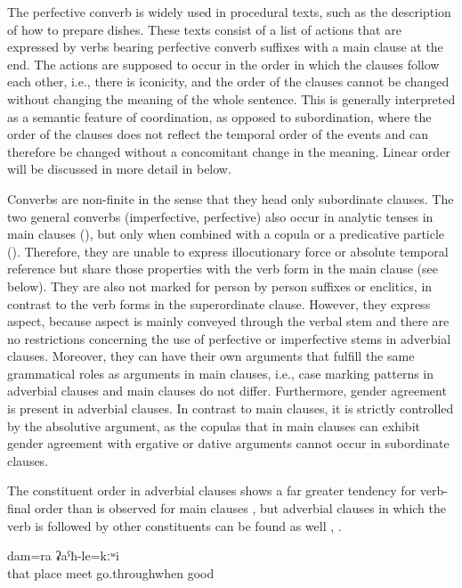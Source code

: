 The perfective converb is widely used in procedural texts, such as the description of how to prepare dishes. These texts consist of a list of actions that are expressed by verbs bearing perfective converb suffixes with a main clause at the end. The actions are supposed to occur in the order in which the clauses follow each other, i.e., there is iconicity, and the order of the clauses cannot be changed without changing the meaning of the whole sentence. This is generally interpreted as a semantic feature of coordination, as opposed to subordination, where the order of the clauses does not reflect the temporal order of the events and can therefore be changed without a concomitant change in the meaning. Linear order will be discussed in more detail in  below.

Converbs are non-finite in the sense that they head only subordinate clauses. The two general converbs (imperfective, perfective) also occur in analytic tenses in main clauses (), but only when combined with a copula or a predicative particle (). Therefore, they are unable to express illocutionary force or absolute temporal reference but share those properties with the verb form in the main clause (see  below). They are also not marked for person by person suffixes or enclitics, in contrast to the verb forms in the superordinate clause. However, they express aspect, because aspect is mainly conveyed through the verbal stem and there are no restrictions concerning the use of perfective or imperfective stems in adverbial clauses. Moreover, they can have their own arguments that fulfill the same grammatical roles as arguments in main clauses, i.e., case marking patterns in adverbial clauses and main clauses do not differ. Furthermore, gender agreement is present in adverbial clauses. In contrast to main clauses, it is strictly controlled by the absolutive argument, as the copulas that in main clauses can exhibit gender agreement with ergative or dative arguments cannot occur in subordinate clauses.

The constituent order in adverbial clauses shows a far greater tendency for verb-final order than is observed for main clauses , but adverbial clauses in which the verb is followed by other constituents can be found as well , .
%
\begin{exe}
	\ex	\label{ex:‎[when I was in that situation], when I also was in a place like this, I also did not feel well}
	\gll	[hel=ʁuna	musna-w	ink	w-aq-ib=qːel	du=ra]	dam=ra	ʡaˁħ-le=kːʷi\\
		that	place	meet	go.throughwhen			good\\
	\glt	{}
\end{exe}


